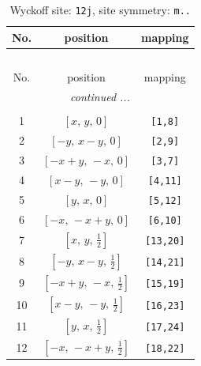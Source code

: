 \documentclass[fleqn,8pt]{jsarticle}
\begin{document}
\begin{longtable}{ccc}
\caption{Wyckoff site: {\tt 12j}, site symmetry: {\tt m..}}
 \\
 \hline \hline
No. & position & mapping \\ \hline \endfirsthead

\multicolumn{2}{l}{\tablename\ \thetable{}} \\
 \hline \hline
No. & position & mapping \\ \hline \endhead

 \hline \hline
\multicolumn{2}{r}{\footnotesize\it continued ...} \\ \endfoot

 \hline \hline
\multicolumn{2}{r}{} \\ \endlastfoot

1 & $\left[ x,\, y,\, 0 \right]$ & {\tt [1,8]} \\ \hline
2 & $\left[ - y,\, x - y,\, 0 \right]$ & {\tt [2,9]} \\ \hline
3 & $\left[ - x + y,\, - x,\, 0 \right]$ & {\tt [3,7]} \\ \hline
4 & $\left[ x - y,\, - y,\, 0 \right]$ & {\tt [4,11]} \\ \hline
5 & $\left[ y,\, x,\, 0 \right]$ & {\tt [5,12]} \\ \hline
6 & $\left[ - x,\, - x + y,\, 0 \right]$ & {\tt [6,10]} \\ \hline
7 & $\left[ x,\, y,\, \frac{1}{2} \right]$ & {\tt [13,20]} \\ \hline
8 & $\left[ - y,\, x - y,\, \frac{1}{2} \right]$ & {\tt [14,21]} \\ \hline
9 & $\left[ - x + y,\, - x,\, \frac{1}{2} \right]$ & {\tt [15,19]} \\ \hline
10 & $\left[ x - y,\, - y,\, \frac{1}{2} \right]$ & {\tt [16,23]} \\ \hline
11 & $\left[ y,\, x,\, \frac{1}{2} \right]$ & {\tt [17,24]} \\ \hline
12 & $\left[ - x,\, - x + y,\, \frac{1}{2} \right]$ & {\tt [18,22]} \\
\end{longtable}
\renewcommand{\arraystretch}{1.2}
\end{document}
